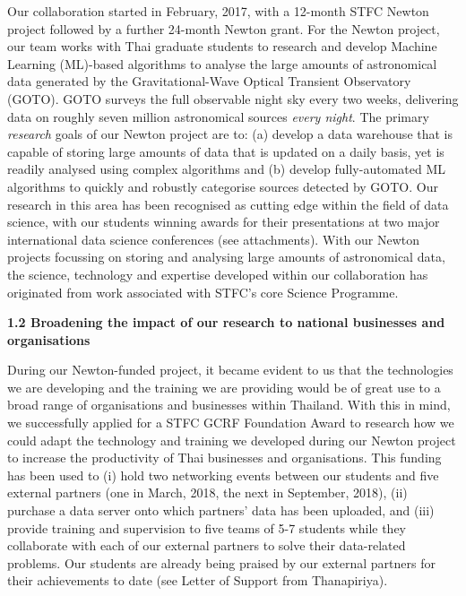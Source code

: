 \documentclass[11pt]{article}
\begin{document}
  \vspace{2mm}
  \noindent
  Our collaboration started in February, 2017, with a 12-month STFC Newton project followed by a further 24-month Newton grant. For the Newton project, our team works with Thai graduate students to research and develop Machine Learning (ML)-based algorithms to analyse the large amounts of astronomical data generated by the Gravitational-Wave Optical Transient Observatory (GOTO). GOTO surveys the full observable night sky every two weeks, delivering data on roughly seven million astronomical sources {\it every night}. The primary {\it research} goals of our Newton project are to: (a) develop a data warehouse that is capable of storing large amounts of data that is updated on a daily basis, yet is readily analysed using complex algorithms and (b) develop fully-automated ML algorithms to quickly and robustly categorise sources detected by GOTO. Our research in this area has been recognised as cutting edge within the field of data science, with our students winning awards for their presentations at two major international data science conferences (see attachments). With our Newton projects focussing on storing and analysing large amounts of astronomical data, the science, technology and expertise developed within our collaboration has originated from work associated with STFC's core Science Programme. 
  
  \vspace{3mm}
  \noindent
  {\large \bf 1.2 Broadening the impact of our research to national businesses and organisations}
  
  \noindent
  During our Newton-funded project, it became evident to us that the technologies we are developing and the training we are providing would be of great use to a broad range of organisations and businesses within Thailand. With this in mind, we successfully applied for a STFC GCRF Foundation Award to research how we could adapt the technology and training we developed during our Newton project to increase the productivity of Thai businesses and organisations. This funding has been used to (i) hold two networking events between our students and five external partners (one in March, 2018, the next in September, 2018), (ii) purchase a data server onto which partners' data has been uploaded, and (iii) provide training and supervision to five teams of 5-7 students while they collaborate with each of our external partners to solve their data-related problems. Our students are already being praised by our external partners for their achievements to date (see Letter of Support from Thanapiriya).
  
\end{document}
